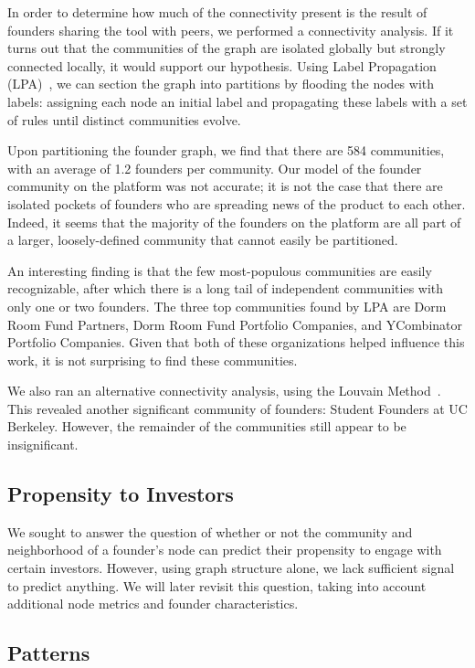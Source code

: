 In order to determine how much of the connectivity present is the result of founders sharing the tool with peers, we performed a connectivity analysis. If it turns out that the communities of the graph are isolated globally but strongly connected locally, it would support our hypothesis. Using Label Propagation (LPA)~\cite{2007PhRvE..76c6106R}, we can section the graph into partitions by flooding the nodes with labels: assigning each node an initial label and propagating these labels with a set of rules until distinct communities evolve.

Upon partitioning the founder graph, we find that there are 584 communities, with an average of 1.2 founders per community. Our model of the founder community on the platform was not accurate; it is not the case that there are isolated pockets of founders who are spreading news of the product to each other. Indeed, it seems that the majority of the founders on the platform are all part of a larger, loosely-defined community that cannot easily be partitioned.

An interesting finding is that the few most-populous communities are easily recognizable, after which there is a long tail of independent communities with only one or two founders. The three top communities found by LPA are Dorm Room Fund Partners, Dorm Room Fund Portfolio Companies, and YCombinator Portfolio Companies. Given that both of these organizations helped influence this work, it is not surprising to find these communities.

We also ran an alternative connectivity analysis, using the Louvain Method~\cite{2008JSMTE..10..008B}. This revealed another significant community of founders: Student Founders at UC Berkeley. However, the remainder of the communities still appear to be insignificant.

\subsection{Propensity to Investors}

We sought to answer the question of whether or not the community and neighborhood of a founder's node can predict their propensity to engage with certain investors. However, using graph structure alone, we lack sufficient signal to predict anything. We will later revisit this question, taking into account additional node metrics and founder characteristics.

\subsection{Patterns}

